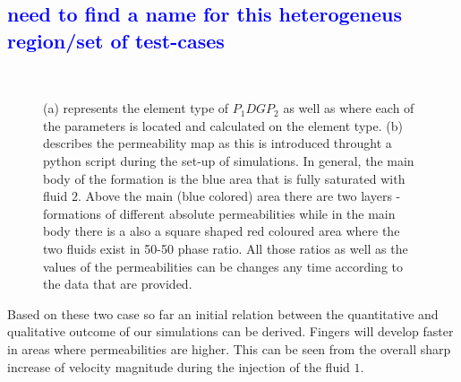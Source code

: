 \documentclass[preprint,authoryear,12pt]{elsarticle}
\newcommand{\blue}{\textcolor{blue}}
\begin{document}
\subsection{\blue{need to find a name for this heterogeneus region/set of test-cases}}


\begin{figure}[h]
\begin{center}
%
\\
\end{center}
\caption{(a) represents the element type of $P_{1}DGP_{2}$ as well as where each of the parameters is located and calculated on the element type. (b) describes the permeability map as this is introduced throught a python script during the set-up of simulations. In general, the main body of the formation is the blue area that is fully saturated with fluid $2$. Above the main (blue colored) area there are two layers - formations of different absolute permeabilities while in the main body there is a also a square shaped red coloured area where the two fluids exist in 50-50 phase ratio. All those ratios as well as the values of the permeabilities can be changes any time according to the data that are provided.   }
\label{fig:elem_type_perm_map}
\end{figure}




Based on these two case so far an initial relation between the quantitative and qualitative outcome of our simulations can be derived. Fingers will develop faster in areas where permeabilities are higher. This can be seen from the overall sharp increase of velocity magnitude during the injection of the fluid $1$. 
\end{document}
